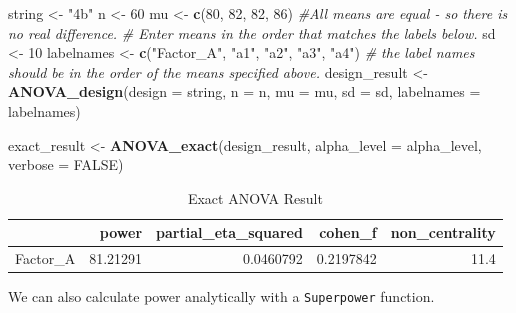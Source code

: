 \documentclass[
]{book}
\newenvironment{Shaded}{\begin{snugshade}}{\end{snugshade}}
\newcommand{\CommentTok}[1]{\textcolor[rgb]{0.56,0.35,0.01}{\textit{#1}}}
\newcommand{\DataTypeTok}[1]{\textcolor[rgb]{0.13,0.29,0.53}{#1}}
\newcommand{\DecValTok}[1]{\textcolor[rgb]{0.00,0.00,0.81}{#1}}
\newcommand{\KeywordTok}[1]{\textcolor[rgb]{0.13,0.29,0.53}{\textbf{#1}}}
\newcommand{\NormalTok}[1]{#1}
\newcommand{\OperatorTok}[1]{\textcolor[rgb]{0.81,0.36,0.00}{\textbf{#1}}}
\newcommand{\OtherTok}[1]{\textcolor[rgb]{0.56,0.35,0.01}{#1}}
\newcommand{\StringTok}[1]{\textcolor[rgb]{0.31,0.60,0.02}{#1}}
\begin{document}
\begin{Shaded}
\begin{Highlighting}[]
\NormalTok{string <-}\StringTok{ "4b"}
\NormalTok{n <-}\StringTok{ }\DecValTok{60}
\NormalTok{mu <-}\StringTok{ }\KeywordTok{c}\NormalTok{(}\DecValTok{80}\NormalTok{, }\DecValTok{82}\NormalTok{, }\DecValTok{82}\NormalTok{, }\DecValTok{86}\NormalTok{) }
\CommentTok{#All means are equal - so there is no real difference.}
\CommentTok{# Enter means in the order that matches the labels below.}
\NormalTok{sd <-}\StringTok{ }\DecValTok{10}
\NormalTok{labelnames <-}\StringTok{ }\KeywordTok{c}\NormalTok{(}\StringTok{"Factor_A"}\NormalTok{, }\StringTok{"a1"}\NormalTok{, }\StringTok{"a2"}\NormalTok{, }\StringTok{"a3"}\NormalTok{, }\StringTok{"a4"}\NormalTok{) }
\CommentTok{# the label names should be in the order of the means specified above.}
\NormalTok{design_result <-}\StringTok{ }\KeywordTok{ANOVA_design}\NormalTok{(}\DataTypeTok{design =}\NormalTok{ string,}
                   \DataTypeTok{n =}\NormalTok{ n, }
                   \DataTypeTok{mu =}\NormalTok{ mu, }
                   \DataTypeTok{sd =}\NormalTok{ sd, }
                   \DataTypeTok{labelnames =}\NormalTok{ labelnames)}


\NormalTok{exact_result <-}\StringTok{ }\KeywordTok{ANOVA_exact}\NormalTok{(design_result,}
                            \DataTypeTok{alpha_level =}\NormalTok{ alpha_level,}
                            \DataTypeTok{verbose =} \OtherTok{FALSE}\NormalTok{)}
\end{Highlighting}
\end{Shaded}

\begin{table}[!h]

\caption{\label{tab:unnamed-chunk-263}Exact ANOVA Result}
\centering
\begin{tabular}[t]{l|r|r|r|r}
\hline
  & power & partial\_eta\_squared & cohen\_f & non\_centrality\\
\hline
Factor\_A & 81.21291 & 0.0460792 & 0.2197842 & 11.4\\
\hline
\end{tabular}
\end{table}

We can also calculate power analytically with a \texttt{Superpower} function.

\begin{Shaded}
\end{Shaded}
\end{document}
